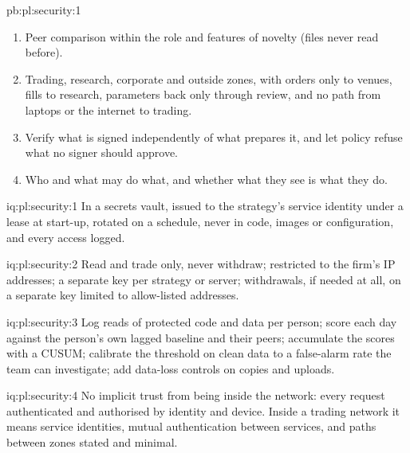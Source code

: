 \begin{solution}{pb:pl:security:1}
\begin{enumerate}
flagged in a median of 22 days (19 of 20) by a CUSUM on a lagged baseline, and 50\% more in 12 days (20 of 20); a single-day threshold on a
trailing baseline flags one of twenty. The policy held 5 toxic roles and 60 toxic people before the fix, none after.
\item Peer comparison within the role and features of novelty (files never read before).
\item Trading, research, corporate and outside zones, with orders only to venues, fills to research, parameters back only through review, and
no path from laptops or the internet to trading.
\item Verify what is signed independently of what prepares it, and let policy refuse what no signer should approve.
\item Who and what may do what, and whether what they see is what they do.
\end{enumerate}
\end{solution}

\begin{solution}{iq:pl:security:1}
In a secrets vault, issued to the strategy's service identity under a lease at start-up, rotated on a schedule, never in code, images or
configuration, and every access logged.
\end{solution}

\begin{solution}{iq:pl:security:2}
Read and trade only, never withdraw; restricted to the firm's IP addresses; a separate key per strategy or server; withdrawals, if needed at
all, on a separate key limited to allow-listed addresses.
\end{solution}

\begin{solution}{iq:pl:security:3}
Log reads of protected code and data per person; score each day against the person's own lagged baseline and their peers; accumulate the
scores with a CUSUM; calibrate the threshold on clean data to a false-alarm rate the team can investigate; add data-loss controls on copies
and uploads.
\end{solution}

\begin{solution}{iq:pl:security:4}
No implicit trust from being inside the network: every request authenticated and authorised by identity and device. Inside a trading network
it means service identities, mutual authentication between services, and paths between zones stated and minimal.
\end{solution}

